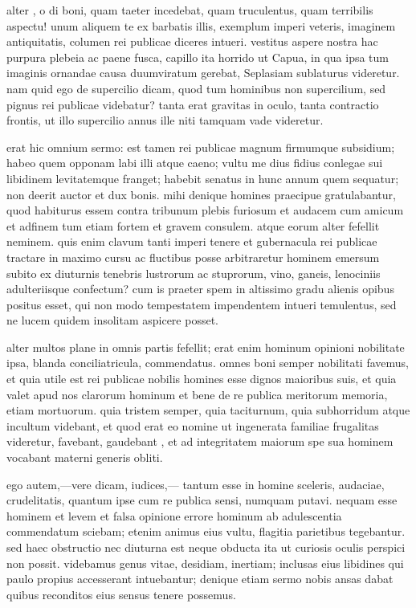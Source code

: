  alter , o di boni, quam taeter incedebat, quam truculentus, quam terribilis aspectu! unum aliquem te ex barbatis illis, exemplum imperi veteris, imaginem antiquitatis, columen rei publicae diceres intueri. vestitus aspere nostra hac purpura plebeia ac paene fusca, capillo ita horrido ut Capua, in qua ipsa tum imaginis ornandae causa duumviratum gerebat, Seplasiam sublaturus videretur. nam quid ego de supercilio dicam, quod tum hominibus non supercilium, sed pignus rei publicae videbatur? tanta erat gravitas in oculo, tanta contractio frontis, ut illo supercilio annus ille niti tamquam vade videretur.

 erat hic omnium sermo: est tamen rei publicae magnum firmumque subsidium; habeo quem opponam labi illi atque caeno; vultu me dius fidius conlegae sui libidinem levitatemque franget; habebit senatus in hunc annum quem sequatur; non deerit auctor et dux bonis. mihi denique homines praecipue gratulabantur, quod habiturus essem contra tribunum plebis furiosum et audacem cum amicum et adfinem tum etiam fortem et gravem consulem. atque eorum alter fefellit neminem. quis enim clavum tanti imperi tenere et gubernacula rei publicae tractare in maximo cursu ac fluctibus posse arbitraretur hominem emersum subito ex diuturnis tenebris lustrorum ac stuprorum, vino, ganeis, lenociniis adulteriisque confectum? cum is praeter spem in altissimo gradu alienis opibus positus esset, qui non modo tempestatem impendentem intueri temulentus, sed ne lucem quidem insolitam aspicere posset.

 alter multos plane in omnis partis fefellit; erat enim hominum opinioni nobilitate ipsa, blanda conciliatricula, commendatus. omnes boni semper nobilitati favemus, et quia utile est rei publicae nobilis homines esse dignos maioribus suis, et quia valet apud nos clarorum hominum et bene de re publica meritorum memoria, etiam mortuorum. quia tristem semper, quia taciturnum, quia subhorridum atque incultum videbant, et quod erat eo nomine ut ingenerata familiae frugalitas videretur, favebant, gaudebant , et ad integritatem maiorum spe sua hominem vocabant materni generis obliti.

 ego autem,—vere dicam, iudices,— tantum esse in homine sceleris, audaciae, crudelitatis, quantum ipse cum re publica sensi, numquam putavi. nequam esse hominem et levem et falsa opinione errore hominum ab adulescentia commendatum sciebam; etenim animus eius vultu, flagitia parietibus tegebantur. sed haec obstructio nec diuturna est neque obducta ita ut curiosis oculis perspici non possit. videbamus genus vitae, desidiam, inertiam; inclusas eius libidines qui paulo propius accesserant intuebantur; denique etiam sermo nobis ansas dabat quibus reconditos eius sensus tenere possemus.


